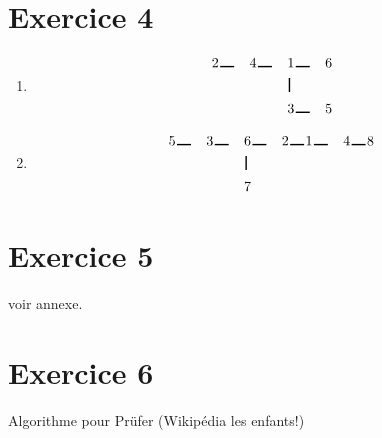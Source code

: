 \documentclass{article}
\begin{document}
\section*{Exercice 4}
\begin{enumerate}
\item 
\begin{alignat*}{10}
&2 \hspace{1pt}\rule{10pt}{1pt} \hspace{1pt}&&4\hspace{1pt}\rule{10pt}{1pt} \hspace{1pt}&&1\hspace{1pt}\rule{10pt}{1pt}\hspace{1pt} &6\\
& && &&\hspace{1pt}\rule{1pt}{10pt} &\\
& && &&3 \hspace{1pt}\rule{10pt}{1pt} &5
\end{alignat*}
\item
\begin{alignat*}{10}
&5 \hspace{1pt}\rule{10pt}{1pt} \hspace{1pt}&&3 \hspace{1pt}\rule{10pt}{1pt} \hspace{1pt}&&6 \hspace{1pt}\rule{10pt}{1pt}\hspace{1pt} &2\hspace{1pt}\rule{10pt}{1pt}\hspace{1pt} &1 \hspace{1pt}\rule{10pt}{1pt}\hspace{1pt} &4 \hspace{1pt}\rule{10pt}{1pt}\hspace{1pt} &8\\
& && &&\hspace{1pt}\rule{1pt}{10pt} &\\
& && &&7
\end{alignat*}
\end{enumerate}

\section*{Exercice 5}
voir annexe.

\section*{Exercice 6}
Algorithme pour Prüfer (Wikipédia les enfants!)
\end{document}
